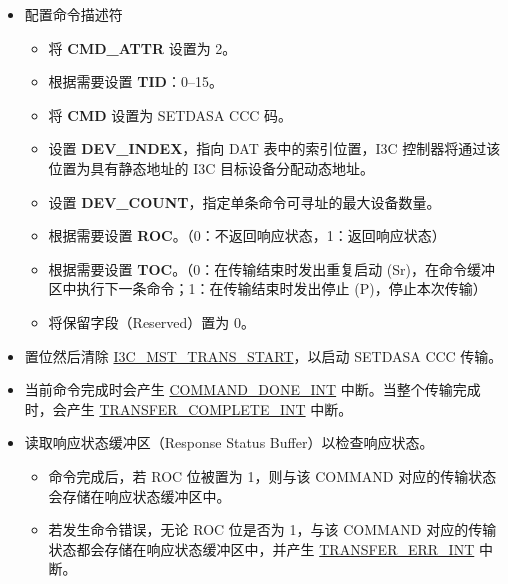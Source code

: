 \documentclass[main\_\_CN.tex]{subfiles}
\begin{document}
\begin{itemize}
    \item 配置命令描述符
    \begin{itemize}
        \item 将 \textbf{CMD\_ATTR} 设置为 2。
        \item 根据需要设置 \textbf{TID}：0–15。
        \item 将 \textbf{CMD} 设置为 SETDASA CCC 码。
        \item 设置 \textbf{DEV\_INDEX}，指向 DAT 表中的索引位置，I3C 控制器将通过该位置为具有静态地址的 I3C 目标设备分配动态地址。
        \item 设置 \textbf{DEV\_COUNT}，指定单条命令可寻址的最大设备数量。
        \item 根据需要设置 \textbf{ROC}。（0：不返回响应状态，1：返回响应状态）
        \item 根据需要设置 \textbf{TOC}。（0：在传输结束时发出重复启动 (Sr)，在命令缓冲区中执行下一条命令；1：在传输结束时发出停止 (P)，停止本次传输）
        \item 将保留字段（Reserved）置为 0。
    \end{itemize}
    \item 置位然后清除 \hyperref[fielddesc:I3CMSTREGTRANSSTART]{I3C\_MST\_TRANS\_START}，以启动 SETDASA CCC 传输。
    \item 当前命令完成时会产生 \hyperref[int:COMMANDDONEINT]{COMMAND\_DONE\_INT} 中断。当整个传输完成时，会产生 \hyperref[int:TRANSFERCOMPLETEINT]{TRANSFER\_COMPLETE\_INT} 中断。
    \item 读取响应状态缓冲区（Response Status Buffer）以检查响应状态。
    \begin{itemize}
        \item 命令完成后，若 ROC 位被置为 1，则与该 COMMAND 对应的传输状态会存储在响应状态缓冲区中。
        \item 若发生命令错误，无论 ROC 位是否为 1，与该 COMMAND 对应的传输状态都会存储在响应状态缓冲区中，并产生 \hyperref[int:TRANSFERERRINT]{TRANSFER\_ERR\_INT} 中断。
    \end{itemize}
\end{itemize}
\end{document}
